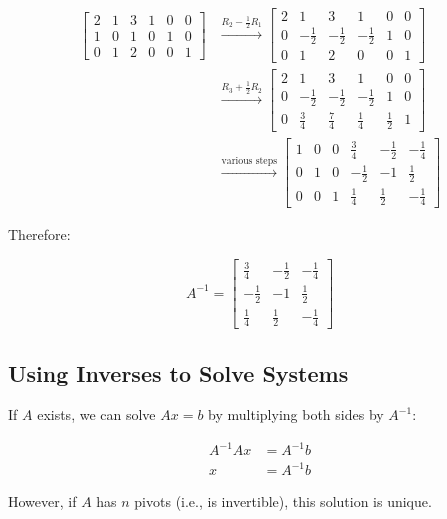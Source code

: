\documentclass[12pt,a4paper]{article}
\begin{document}
\begin{align*}
\left[\begin{array}{ccc|ccc}
2 & 1 & 3 & 1 & 0 & 0 \\
1 & 0 & 1 & 0 & 1 & 0 \\
0 & 1 & 2 & 0 & 0 & 1
\end{array}\right]
&\xrightarrow{R_2 - \frac{1}{2}R_1}
\left[\begin{array}{ccc|ccc}
2 & 1 & 3 & 1 & 0 & 0 \\
0 & -\frac{1}{2} & -\frac{1}{2} & -\frac{1}{2} & 1 & 0 \\
0 & 1 & 2 & 0 & 0 & 1
\end{array}\right] \\
&\xrightarrow{R_3 + \frac{1}{2}R_2}
\left[\begin{array}{ccc|ccc}
2 & 1 & 3 & 1 & 0 & 0 \\
0 & -\frac{1}{2} & -\frac{1}{2} & -\frac{1}{2} & 1 & 0 \\
0 & \frac{3}{4} & \frac{7}{4} & \frac{1}{4} & \frac{1}{2} & 1
\end{array}\right] \\
&\xrightarrow{\text{various steps}}
\left[\begin{array}{ccc|ccc}
1 & 0 & 0 & \frac{3}{4} & -\frac{1}{2} & -\frac{1}{4} \\
0 & 1 & 0 & -\frac{1}{2} & -1 & \frac{1}{2} \\
0 & 0 & 1 & \frac{1}{4} & \frac{1}{2} & -\frac{1}{4}
\end{array}\right]
\end{align*}

Therefore:

\begin{equation}
A^{-1} = \begin{bmatrix}
\frac{3}{4} & -\frac{1}{2} & -\frac{1}{4} \\
-\frac{1}{2} & -1 & \frac{1}{2} \\
\frac{1}{4} & \frac{1}{2} & -\frac{1}{4}
\end{bmatrix}
\end{equation}

\subsection{Using Inverses to Solve Systems}

If $A$ exists, we can solve $Ax = b$ by multiplying both sides by $A^{-1}$:

\begin{align*}
A^{-1}Ax &= A^{-1}b \\
x &= A^{-1}b
\end{align*}

However, if $A$ has $n$ pivots (i.e., is invertible), this solution is unique.
\end{document}
